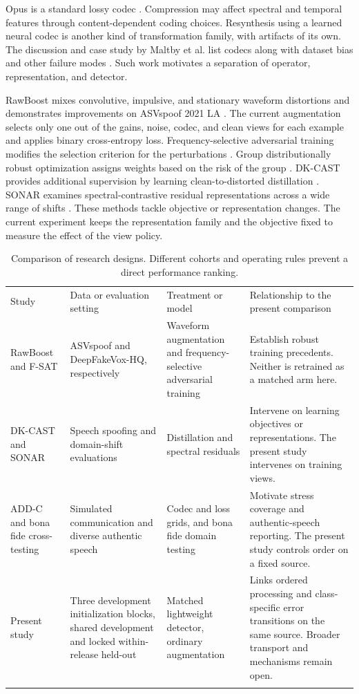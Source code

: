 Opus is a standard lossy codec \cite{opus}. Compression may affect spectral and temporal features through content-dependent coding choices. Resynthesis using a learned neural codec is another kind of transformation family, with artifacts of its own. The discussion and case study by Maltby et al. list codecs along with dataset bias and other failure modes \cite{maltby}. Such work motivates a separation of operator, representation, and detector.

RawBoost mixes convolutive, impulsive, and stationary waveform distortions and demonstrates improvements on ASVspoof 2021 LA \cite{rawboost}. The current augmentation selects only one out of the gains, noise, codec, and clean views for each example and applies binary cross-entropy loss. Frequency-selective adversarial training modifies the selection criterion for the perturbations \cite{fsat}. Group distributionally robust optimization assigns weights based on the risk of the group \cite{dro}. DK-CAST provides additional supervision by learning clean-to-distorted distillation \cite{dkcast}. SONAR examines spectral-contrastive residual representations across a wide range of shifts \cite{sonar}. These methods tackle objective or representation changes. The current experiment keeps the representation family and the objective fixed to measure the effect of the view policy.

\begin{table}[t]
\caption{Comparison of research designs. Different cohorts and operating rules prevent a direct performance ranking.}\label{tab:prior}
\centering
\begin{tabular}{@{}p{}p{}p{}p{}@{}}
\toprule
Study & Data or evaluation setting & Treatment or model & Relationship to the present comparison\\
\colrule
RawBoost and F-SAT \cite{rawboost,fsat} & ASVspoof and DeepFakeVox-HQ, respectively & Waveform augmentation and frequency-selective adversarial training & Establish robust training precedents. Neither is retrained as a matched arm here.\\
DK-CAST and SONAR \cite{dkcast,sonar} & Speech spoofing and domain-shift evaluations & Distillation and spectral residuals & Intervene on learning objectives or representations. The present study intervenes on training views.\\
ADD-C and bona fide cross-testing \cite{addc,kwok} & Simulated communication and diverse authentic speech & Codec and loss grids, and bona fide domain testing & Motivate stress coverage and authentic-speech reporting. The present study controls order on a fixed source.\\
Present study & Three development initialization blocks, shared development and locked within-release held-out & Matched lightweight detector, ordinary augmentation & Links ordered processing and class-specific error transitions on the same source. Broader transport and mechanisms remain open.\\
\botrule
\end{tabular}
\end{table}

